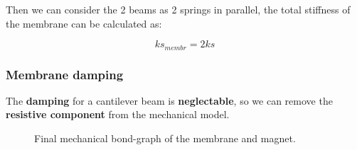 \begin{samepage}
    Then we can consider the 2 beams as 2 springs in parallel, the total stiffness of the membrane can be calculated as:
    \nopagebreak

    \begin{equation*}
        ks_{membr} = 2 ks
    \end{equation*}
\end{samepage}


\begin{samepage}
    \subsubsection{Membrane damping}
    \nopagebreak

    The \textbf{damping} for a cantilever beam is \textbf{neglectable}, so we can remove the \textbf{resistive component} from the mechanical model.
    \nopagebreak

    \begin{figure}[H]
        \centering
        \resizebox{.45\linewidth}{!}{
                
        }
        \caption{Final mechanical bond-graph of the membrane and magnet.}
        \label{fig:Membrane_bond graph_without_damping}
    \end{figure}
\end{samepage}

